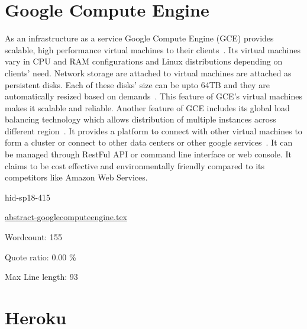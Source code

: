 \section{Google Compute Engine}

As an infrastructure as a service Google Compute Engine (GCE) provides scalable, 
high performance  virtual machines to their clients~\cite{hid-sp18-415-cloud-google}. 
Its virtual machines vary in CPU and RAM configurations  and Linux distributions 
depending on clients' need. Network storage are attached to virtual machines are 
attached as persistent disks. Each of these disks' size can be upto 64TB and 
they are automatically resized based on demands~\cite{hid-sp18-415-cloud-google}. 
This feature of GCE's virtual machines makes it scalable and reliable. Another 
feature of GCE includes its global load balancing technology which allows 
distribution of multiple instances across different region~\cite{hid-sp18-415-cloud-google}. 
It provides a platform to connect with other virtual machines to form a cluster or 
connect to other data centers or other google services~\cite{hid-sp18-415-cloud-google}. 
It can be managed through RestFul API or command line interface or web console. 
It claims to be cost effective and environmentally friendly compared to its 
competitors like Amazon Web Services.


\begin{IU}

hid-sp18-415

\href{https://github.com/cloudmesh-community/hid-sp18-415/blob/master//technology/abstract-googlecomputeengine.tex}{abstract-googlecomputeengine.tex}

 

Wordcount: 155


Quote ratio: 0.00 \%
 
Max Line length: 93
\end{IU}

\section{Heroku}
 
